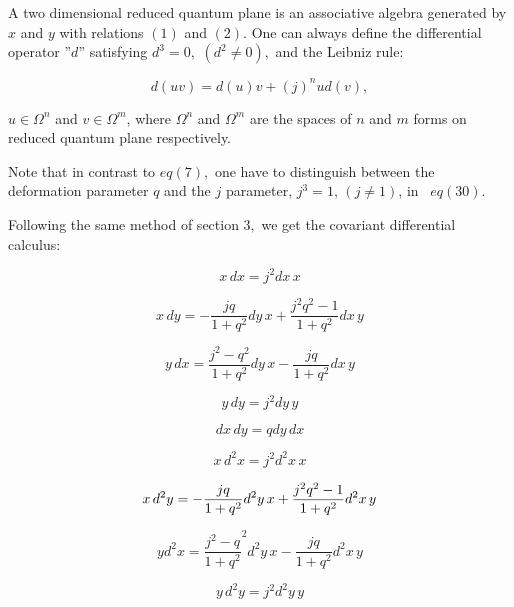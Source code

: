 \documentclass[a4paper,12pt,thmsa]{article}
\begin{document}
A two dimensional reduced quantum plane is an associative algebra generated
by $x$ and $y$ with relations $(1)$ and $(2).$ One can always define the
differential operator ''$d$'' satisfying $d^3=0,$ $(d^2\neq 0),$ and the
Leibniz rule:

\begin{equation}
d(uv)=d(u)v+(j)^nud(v),
\end{equation}

$u\in \Omega ^n$ and $v\in \Omega ^m$, where $\Omega ^n$ and $\Omega ^m$ are
the spaces of $n$ and $m$ forms on reduced quantum plane respectively.

Note that in contrast to $eq(7),$ one have to distinguish between the
deformation parameter $q$ and the $j$ parameter, $j^3=1$, $(j\neq 1)$, in ~$%
eq(30)$.

Following the same method of section $3,$ we get the covariant differential
calculus:

\begin{equation}
x\, dx=j^{2}dx\, x
\end{equation}

\begin{equation}
x\, dy=-\frac{jq}{1+q^2}dy\, x+\frac{j^2q^2-1}{1+q^2}dx\, y
\end{equation}

\begin{equation}
y\, dx=\frac{j^2-q^2}{1+q^2}dy\, x-\frac{jq}{1+q^2}dx\, y
\end{equation}

\begin{equation}
y\, dy=j^2dy\, y
\end{equation}

\begin{equation}
dx\, dy=qdy\, dx
\end{equation}

\begin{equation}
x\, d^{2}x=j^{2}d^{2}x\, x
\end{equation}

\begin{equation}
x\, d^{2}y=-\frac{jq}{1+q^{2}}d^{2}y\, x+\frac{j^{2}q^{2}-1}{%
1+q^{2}}d^{2}x\, y
\end{equation}

\begin{equation}
yd^2x=\frac{j^2-q}{1+q^2}^2d^2y\, x-\frac{jq}{1+q^2}d^2x\, y
\end{equation}

\begin{equation}
y\, d^2y=j^2d^2y\, y
\end{equation}
\end{document}
